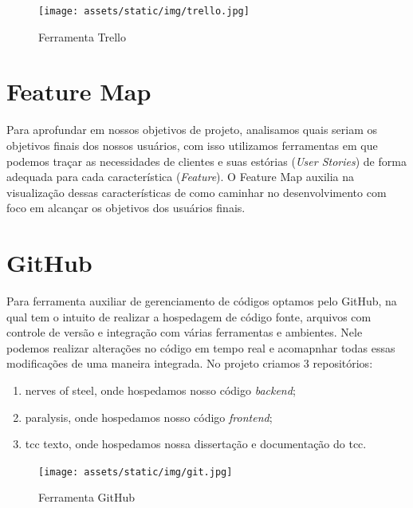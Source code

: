\documentclass[../../layout.tex]{subfiles}
\begin{document}
\begin{figure}[H]
\centering
\caption{Ferramenta Trello}
\texttt{[image: assets/static/img/trello.jpg]}
\label{fig:trello}

\begin{minipage}{0.5\textwidth}
\end{minipage}
\end{figure}

\section{Feature Map}
Para aprofundar em nossos objetivos de projeto, analisamos quais seriam os objetivos finais dos nossos usuários, com isso utilizamos ferramentas em que podemos traçar as necessidades de clientes e suas estórias (\emph{User Stories}) de forma adequada para cada característica (\emph{Feature}). O Feature Map auxilia na visualização dessas características de como caminhar no desenvolvimento com foco em alcançar os objetivos dos usuários finais.

\section{GitHub}
Para ferramenta auxiliar de gerenciamento de códigos optamos pelo GitHub, na qual tem o intuito de realizar a hospedagem de código fonte, arquivos com controle de versão e integração com várias ferramentas e ambientes. Nele podemos realizar alterações no código em tempo real e acomapnhar todas essas modificações de uma maneira integrada. No projeto criamos 3 repositórios:

\begin{enumerate}[label=\alph*)]
\itemsep0em
	\item nerves of steel, onde hospedamos nosso código \emph{backend};
	\item paralysis, onde hospedamos nosso código \emph{frontend};
	\item tcc texto, onde hospedamos nossa dissertação e documentação do tcc.
\end{enumerate}

\begin{figure}[H]
\centering
\caption{Ferramenta GitHub}
\texttt{[image: assets/static/img/git.jpg]}
\label{fig:i2c_structure}

\begin{minipage}{0.5\textwidth}
\end{minipage}
\end{figure}
\end{document}
